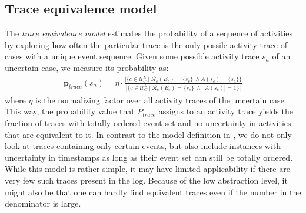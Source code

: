 \subsection{Trace equivalence model}
The \textit{trace equivalence model} estimates the probability of a sequence of activities by exploring how often the particular trace is the only possile activity trace of cases with a unique event sequence.
Given some possible activity trace $s_a$ of an uncertain case, we measure its probability as:
\begin{align*}
\textbf{p}_{trace}(s_a) = \eta \cdot \frac{|\{ c \in \mathcal{U}_C^L \mid \mathcal{R}_e(E_c)= \{s_e\} ~ \wedge A(s_e)= \{s_a \} \} }
{|\{ c \in \mathcal{U}_C^L \mid \mathcal{R}_e(E_c)= \{s_e\} ~ \wedge ~ |A(s_e)| = 1\}|}
\end{align*}
where $\eta$ is the normalizing factor over all activity traces of the uncertain case.\\
This way, the probability value that $P_{trace}$ assigns to an activity trace yields the fraction of traces with totally ordered event set and no uncertainty in activities that are equivalent to it.
In contrast to the model definition in \cite{por}, we do not only look at traces containing only certain events, but also include instances with uncertainty in timestamps as long as their event set can still be totally ordered.
While this model is rather simple, it may have limited applicability if there are very few such traces present in the log.
Because of the low abstraction level, it might also be that one can hardly find equivalent traces even if the number in the denominator is large.


